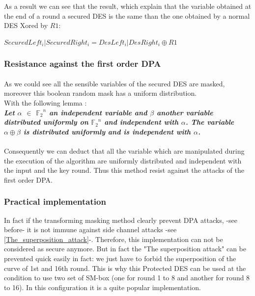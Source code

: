 As a result we can see that the result, which explain that the variable obtained at the
end of a round a secured DES is the same than the one obtained by a normal DES Xored by $R1$:
\begin{center}
$SecuredLeft_i | SecuredRight_i = DesLeft_i| DesRight_i \oplus R1$\\
\end{center}

\subsubsection{Resistance against the first order DPA}
\paragraph*{} As we could see all the sensible variables of the secured DES are masked, 
moreover this boolean random mask has a uniform distribution.\\

\vspace{3mm}
With the following lemma :\\
\textbf{\textit{Let $\alpha$ $\in$ ${\mathbb{F}_2}^{n}$ an independent variable and
 $\beta$ another variable distributed uniformly on ${\mathbb{F}_2}^{n}$ and
  independent with $\alpha$. The variable $\alpha \oplus \beta$ is
 distributed uniformly and is independent with $\alpha$.}}\\
 \\
\indent Consequently we can deduct that all the variable which are manipulated
during the execution of the algorithm are uniformly distributed and
independent with the input and the key round. Thus this method resist against the
attacks of the first order DPA.


\subsubsection{Practical implementation}

In fact if the transforming masking method clearly prevent DPA attacks, 
-see before- it is not immune against side channel attacks
-see \ref{The_superposition_attack}-.
Therefore, this implementation can not be considered as secure anymore.
But in fact the "The superposition attack" can be prevented quick easily in fact:
we just have to forbid the superposition of the curve of 1st and 16th round.
This is why this Protected DES can be used at the condition to use 
two set of SM-box (one for round 1 to 8 and another for round 8 to 16).
In this configuration it is a quite popular implementation.

